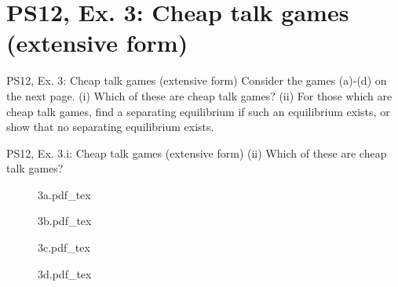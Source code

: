 \section{PS12, Ex. 3: Cheap talk games (extensive form)}

\begin{frame}{PS12, Ex. 3: Cheap talk games (extensive form)}
    Consider the games (a)-(d) on the next page. (i) Which of these are cheap talk games? (ii) For those which are cheap talk games, find a separating equilibrium if such an equilibrium exists, or show that no separating equilibrium exists.
    \vfill\null
\end{frame}

\begin{frame}{PS12, Ex. 3.i: Cheap talk games (extensive form)}
    (ii) Which of these are cheap talk games?\vspace{-6pt}
    \begin{multicols}{2}
      \begin{figure}[!h]
        \center{}
        {3a.pdf_tex}
      \end{figure}\vspace{-6pt}
      \begin{figure}[!h]
        \center{}
        {3b.pdf_tex}
      \end{figure}
      \vfill\null\columnbreak
      \begin{figure}[!h]
        \center{}
        {3c.pdf_tex}
      \end{figure}\vspace{-6pt}
      \begin{figure}[!h]
        \center{}
        {3d.pdf_tex}
      \end{figure}
      \vfill\null
    \end{multicols}
\end{frame}
